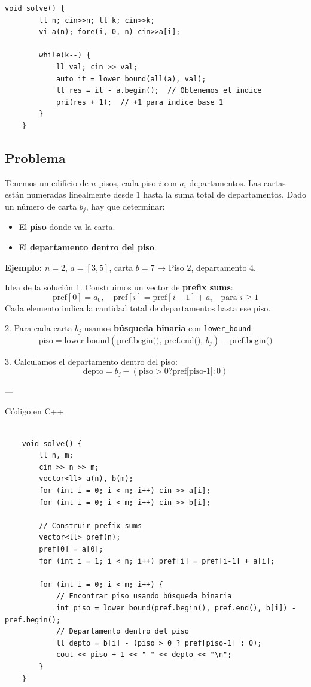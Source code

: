\begin{lstlisting}[style=cppstyle, caption={Obtención del índice con lower\_bound}]
	void solve() {
		ll n; cin>>n; ll k; cin>>k;
		vi a(n); fore(i, 0, n) cin>>a[i];
		
		while(k--) {
			ll val; cin >> val;
			auto it = lower_bound(all(a), val);
			ll res = it - a.begin();  // Obtenemos el indice
			pri(res + 1);  // +1 para indice base 1
		}
	}
\end{lstlisting}

\subsection{Problema}
Tenemos un edificio de $n$ pisos, cada piso $i$ con $a_i$ departamentos. Las cartas están numeradas linealmente desde $1$ hasta la suma total de departamentos.  
Dado un número de carta $b_j$, hay que determinar:
\begin{itemize}
	\item El \textbf{piso} donde va la carta.
	\item El \textbf{departamento dentro del piso}.
\end{itemize}

\textbf{Ejemplo:} $n=2$, $a=[3,5]$, carta $b=7$ → Piso $2$, departamento $4$.

Idea de la solución
1. Construimos un vector de \textbf{prefix sums}:
\[
\text{pref}[0] = a_0, \quad
\text{pref}[i] = \text{pref}[i-1] + a_i \quad \text{para } i \ge 1
\]
Cada elemento indica la cantidad total de departamentos hasta ese piso.  

2. Para cada carta $b_j$ usamos \textbf{búsqueda binaria} con \texttt{lower\_bound}:
\[
\text{piso} = \text{lower\_bound}(\text{pref.begin(), pref.end(), } b_j) - \text{pref.begin()}
\]

3. Calculamos el departamento dentro del piso:
\[
\text{depto} = b_j - (\text{piso}>0 ? \text{pref[piso-1]} : 0)
\]

---

Código en C++
\begin{verbatim}

	void solve() {
		ll n, m;
		cin >> n >> m;
		vector<ll> a(n), b(m);
		for (int i = 0; i < n; i++) cin >> a[i];
		for (int i = 0; i < m; i++) cin >> b[i];
		
		// Construir prefix sums
		vector<ll> pref(n);
		pref[0] = a[0];
		for (int i = 1; i < n; i++) pref[i] = pref[i-1] + a[i];
		
		for (int i = 0; i < m; i++) {
			// Encontrar piso usando búsqueda binaria
			int piso = lower_bound(pref.begin(), pref.end(), b[i]) - pref.begin();
			// Departamento dentro del piso
			ll depto = b[i] - (piso > 0 ? pref[piso-1] : 0);
			cout << piso + 1 << " " << depto << "\n";
		}
	}
	
	
\end{verbatim}



